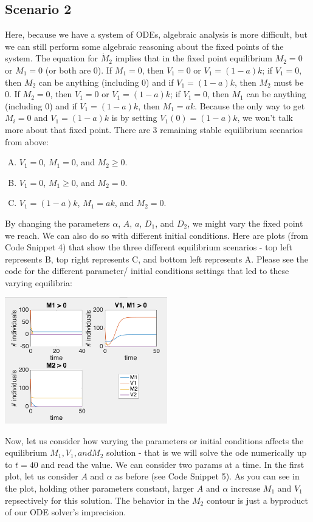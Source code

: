 \documentclass[12pt]{article}
\begin{document}
\subsection{Scenario 2}
Here, because we have a system of ODEs, algebraic analysis is more difficult, but we can still perform some algebraic reasoning about the fixed points of the system. The equation for $\dot M_2$ implies that in the fixed point equilibrium $M_2 = 0$ or $M_1 = 0$ (or both are 0). If $M_1=0$, then $V_1=0$ or $V_1=(1-a)k$; if $V_1 = 0$, then $M_2$ can be anything (including 0) and if $V_1 = (1-a)k$, then $M_2$ must be 0. If $M_2 = 0$, then $V_1=0$ or $V_1=(1-a)k$; if $V_1 = 0$, then $M_1$ can be anything (including 0) and if $V_1 = (1-a)k$, then $M_1 = ak$. Because the only way to get $M_i = 0$ and $V_1 = (1-a)k$ is by setting $V_1(0) = (1-a)k$, we won't talk more about that fixed point. There are 3 remaining stable equilibrium scenarios from above:
\begin{enumerate}[(A)]
\item $V_1 = 0$, $M_1 = 0$, and $M_2 \geq 0$.
\item $V_1 =0$, $M_1 \geq 0$, and $M_2 = 0$.
\item $V_1 = (1-a)k$, $M_1 = ak$, and $M_2 = 0$.
\end{enumerate}

By changing the parameters $\alpha$, $A$, $a$, $D_1$, and $D_2$, we might vary the fixed point we reach. We can also do so with different initial conditions. Here are plots (from Code Snippet 4) that show the three different equilibrium scenarios - top left represents B, top right represents C, and bottom left represents A. Please see the code for the different parameter/ initial conditions settings that led to these varying equilibria:
\begin{center}
\includegraphics[width=200pt]{graph_ext1}
\end{center}

Now, let us consider how varying the parameters or initial conditions affects the equilibrium $M_1, V_1, and M_2$ solution - that is we will solve the ode numerically up to $t=40$ and read the value. We can consider two params at a time. In the first plot, let us consider $A$ and $\alpha$ as before (see Code Snippet 5). As you can see in the plot, holding other parameters constant, larger $A$ and $\alpha$ increase $M_1$ and $V_1$ repsectively for this solution. The behavior in the $M_2$ contour is just a byproduct of our ODE solver's imprecision.
\end{document}
